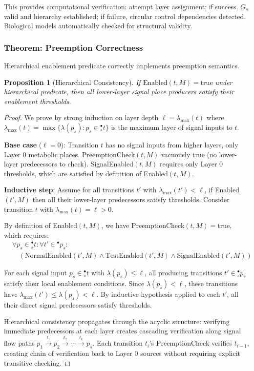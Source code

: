 \documentclass[10pt,letterpaper]{article}
\newtheorem{proposition}{Proposition}
\begin{document}
This provides computational verification: attempt layer assignment; if success, $G_s$ valid and hierarchy established; if failure, circular control dependencies detected. Biological models automatically checked for structural validity.

\subsubsection{Theorem: Preemption Correctness}

Hierarchical enablement predicate correctly implements preemption semantics.

\begin{proposition}[Hierarchical Consistency]
If $\text{Enabled}(t, M) = \text{true}$ under hierarchical predicate, then all lower-layer signal place producers satisfy their enablement thresholds.
\end{proposition}

\begin{proof}
We prove by strong induction on layer depth $\ell = \lambda_{\max}(t)$ where $\lambda_{\max}(t) = \max\{\lambda(p_s) : p_s \in {}^\bullet_s t\}$ is the maximum layer of signal inputs to $t$.

\textbf{Base case} ($\ell = 0$): Transition $t$ has no signal inputs from higher layers, only Layer 0 metabolic places. PreemptionCheck$(t,M)$ vacuously true (no lower-layer predecessors to check). SignalEnabled$(t,M)$ requires only Layer 0 thresholds, which are satisfied by definition of Enabled$(t,M)$.

\textbf{Inductive step}: Assume for all transitions $t'$ with $\lambda_{\max}(t') < \ell$, if Enabled$(t',M)$ then all their lower-layer predecessors satisfy thresholds. Consider transition $t$ with $\lambda_{\max}(t) = \ell > 0$. 

By definition of Enabled$(t,M)$, we have PreemptionCheck$(t,M) = \text{true}$, which requires:
\begin{align*}
&\forall p_s \in {}^\bullet_s t: \forall t' \in {}^{\bullet} p_s: \\
&\quad (\text{NormalEnabled}(t',M) \wedge \text{TestEnabled}(t',M) \wedge \text{SignalEnabled}(t',M))
\end{align*}

For each signal input $p_s \in {}^\bullet_s t$ with $\lambda(p_s) \leq \ell$, all producing transitions $t' \in {}^{\bullet}_s p_s$ satisfy their local enablement conditions. Since $\lambda(p_s) < \ell$, these transitions have $\lambda_{\max}(t') \leq \lambda(p_s) < \ell$. By inductive hypothesis applied to each $t'$, all their direct signal predecessors satisfy thresholds.

Hierarchical consistency propagates through the acyclic structure: verifying immediate predecessors at each layer creates cascading verification along signal flow paths $p_1 \xrightarrow{t_1} p_2 \xrightarrow{t_2} \cdots \xrightarrow{t_k} p_s$. Each transition $t_i$'s PreemptionCheck verifies $t_{i-1}$, creating chain of verification back to Layer 0 sources without requiring explicit transitive checking.
\end{proof}
\end{document}
